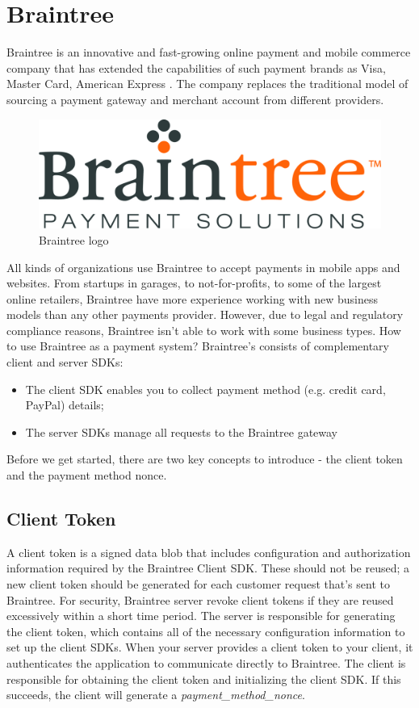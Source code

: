 \section{Braintree}
\label{sec:braintree}
Braintree is an innovative and fast-growing online payment and mobile commerce company that has extended the capabilities of such payment brands as Visa, Master Card, American Express \cite{braintree_docs}.
The company replaces the traditional model of sourcing a payment gateway and merchant account from different providers.
\begin{figure}[htb]
\centering
\includegraphics[width=0.5\linewidth]{images/chapter2/braintree-logo.jpg}\hfill
\caption[Braintree logo]{Braintree logo}
\label{fig:stripe_logo}
\end{figure}
All kinds of organizations use Braintree to accept payments in mobile apps and websites. From startups in garages, to not-for-profits, to some of the largest online retailers, Braintree have more experience working with new business models than any other payments provider. However, due to legal and regulatory compliance reasons, Braintree isn't able to work with some business types. How to use Braintree as a payment system?
Braintree's  consists of complementary client and server SDKs:
\begin{itemize}
\item The client SDK enables you to collect payment method (e.g. credit card, PayPal) details;
\item The server SDKs manage all requests to the Braintree gateway
\end{itemize}
Before we get started, there are two key concepts to introduce - the client token and the payment method nonce.
\subsection{Client Token}
A client token is a signed data blob that includes configuration and authorization information required by the Braintree Client SDK. These should not be reused; a new client token should be generated for each customer request that's sent to Braintree. For security, Braintree server revoke client tokens if they are reused excessively within a short time period.
\newline
The server is responsible for generating the client token, which contains all of the necessary configuration information to set up the client SDKs. When your server provides a client token to your client, it authenticates the application to communicate directly to Braintree.
\newline
The client is responsible for obtaining the client token and initializing the client SDK. If this succeeds, the client will generate a \emph{payment\_method\_nonce}.
